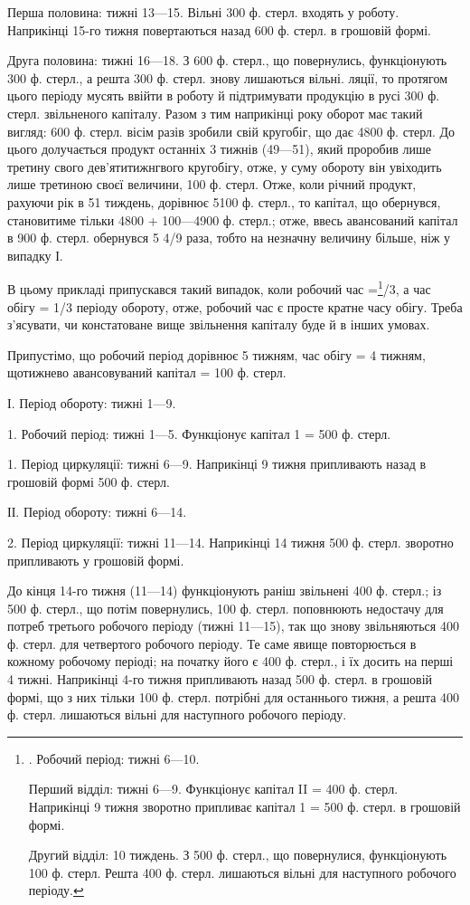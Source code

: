 Перша половина: тижні 13—15. Вільні 300 ф. стерл. входять у
роботу. Наприкінці 15-го тижня повертаються назад 600 ф. стерл. в грошовій
формі.

Друга половина: тижні 16—18. З 600 ф. стерл., що повернулись,
функціонують 300 ф. стерл., а решта 300 ф. стерл. знову лишаються
вільні.
ляції, то протягом цього періоду мусять ввійти в роботу й підтримувати
продукцію в русі 300 ф. стерл. звільненого капіталу. Разом з тим наприкінці
року оборот має такий вигляд: 600 ф. стерл. вісім разів зробили
свій кругобіг, що дає 4800 ф. стерл. До цього долучається продукт
останніх 3 тижнів (49—51), який проробив лише третину свого дев’ятитижнгвого
кругобігу, отже, у суму обороту він увіходить лише третиною
своєї величини, 100 ф. стерл. Отже, коли річний продукт, рахуючи рік в
51 тиждень, дорівнює 5100 ф. стерл., то капітал, що обернувся, становитиме
тільки 4800 + 100—4900 ф. стерл.; отже, ввесь авансований капітал
в 900 ф. стерл. обернувся 5 4/9 раза, тобто на незначну величину більше,
ніж у випадку І.

В цьому прикладі припускався такий випадок, коли робочий час =\footnote{
. Робочий період: тижні 6—10.

Перший відділ: тижні 6—9. Функціонує капітал II = 400 ф. стерл.
Наприкінці 9 тижня зворотно припливає капітал 1 = 500 ф. стерл. в грошовій
формі.

Другий відділ: 10 тиждень. З 500 ф. стерл., що повернулися, функціонують
100 ф. стерл. Решта 400 ф. стерл. лишаються вільні для наступного
робочого періоду.
}/3,
а час обігу = 1/3 періоду обороту, отже, робочий час є просте кратне
часу обігу. Треба з’ясувати, чи констатоване вище звільнення капіталу
буде й в інших умовах.

Припустімо, що робочий період дорівнює 5 тижням, час обігу = 4 тижням,
щотижнево авансовуваний капітал = 100 ф. стерл.

І. Період обороту: тижні 1—9.

1. Робочий період: тижні 1—5. Функціонує капітал 1 = 500 ф. стерл.

1. Період циркуляції: тижні 6—9. Наприкінці 9 тижня припливають
назад в грошовій формі 500 ф. стерл.

ІІ. Період обороту: тижні 6—14.

2. Період циркуляції: тижні 11—14. Наприкінці 14 тижня 500 ф.
стерл. зворотно припливають у грошовій формі.

До кінця 14-го тижня (11—14) функціонують раніш звільнені 400 ф.
стерл.; із 500 ф. стерл., що потім повернулись, 100 ф. стерл. поповнюють
недостачу для потреб третього робочого періоду (тижні 11—15),
так що знову звільняються 400 ф. стерл. для четвертого робочого періоду.
Те саме явище повторюється в кожному робочому періоді; на
початку його є 400 ф. стерл., і їх досить на перші 4 тижні. Наприкінці
4-го тижня припливають назад 500 ф. стерл. в грошовій формі, що з
них тільки 100 ф. стерл. потрібні для останнього тижня, а решта 400 ф.
стерл. лишаються вільні для наступного робочого періоду.

